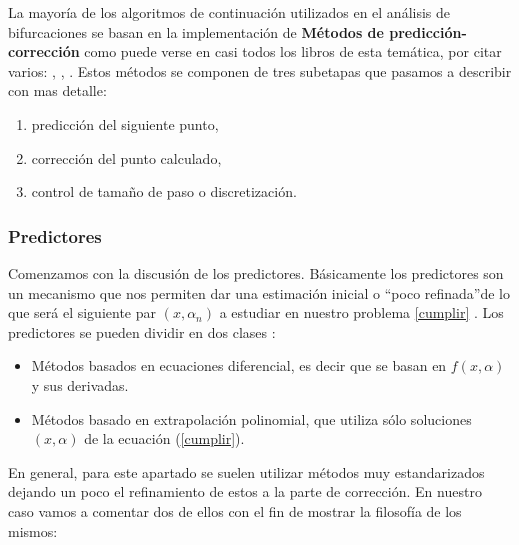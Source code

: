 La mayoría de los algoritmos de continuación utilizados en el análisis de bifurcaciones se basan en la implementación de \textbf{Métodos de predicción-corrección} como puede verse en casi todos los libros de esta temática, por citar varios: \cite{Lectures}, \cite{siam1}, \cite{auto}. Estos métodos se componen de tres subetapas que pasamos a describir con mas detalle:
\begin{enumerate}
	\item predicción del siguiente punto,
    \item corrección del punto calculado,
    \item control de tamaño de paso o discretización.
\end{enumerate}

\subsubsection{Predictores}
Comenzamos con la discusión de los predictores. Básicamente los predictores son un mecanismo que nos permiten dar una estimación inicial o \textquotedblleft poco refinada\textquotedblright de lo que será el siguiente par $(x,\alpha_n)$ a estudiar en nuestro problema \ref{cumplir} . Los predictores se pueden dividir en dos clases \cite{prac}:
\begin{itemize}
	\item  Métodos basados en ecuaciones diferencial, es decir que se basan en $f (x, \alpha)$ y sus derivadas.
	\item Métodos basado en extrapolación polinomial, que utiliza sólo soluciones $(x, \alpha)$ de la ecuación (\ref{cumplir}).
\end{itemize}
 En general, para este apartado se suelen utilizar métodos muy estandarizados dejando un poco el refinamiento de estos a la parte de corrección. En nuestro caso vamos a comentar dos de ellos con el fin de mostrar la filosofía de los mismos:
